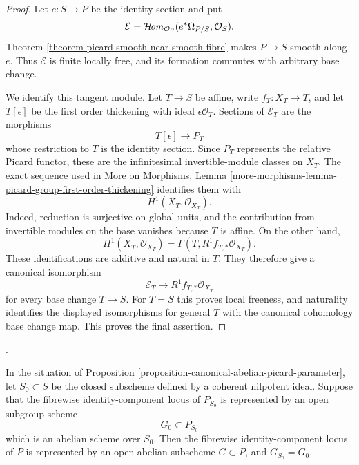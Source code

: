\begin{proof}
Let $e : S \to P$ be the identity section and put
$$
\mathcal{E}=
\mathop{\mathcal{H}\!\mathit{om}}\nolimits_{\mathcal{O}_S}(e^*\Omega_{P/S},\mathcal{O}_S).
$$
Theorem \ref{theorem-picard-smooth-near-smooth-fibre} makes $P \to S$ smooth
along $e$. Thus $\mathcal{E}$ is finite locally free, and its formation
commutes with arbitrary base change.

We identify this tangent module. Let $T \to S$ be affine, write
$f_T : X_T \to T$, and let $T[\epsilon]$ be the first order thickening with
ideal $\epsilon\mathcal{O}_T$. Sections of
$\mathcal{E}_T$ are the morphisms
$$
T[\epsilon] \longrightarrow P_T
$$
whose restriction to $T$ is the identity section. Since $P_T$ represents the
relative Picard functor, these are the infinitesimal invertible-module classes
on $X_T$. The exact sequence used in More on Morphisms, Lemma
\ref{more-morphisms-lemma-picard-group-first-order-thickening} identifies them
with
$$
H^1(X_T,\mathcal{O}_{X_T}).
$$
Indeed, reduction is surjective on global units, and the contribution from
invertible modules on the base vanishes because $T$ is affine. On the other
hand,
$$
H^1(X_T,\mathcal{O}_{X_T})
=\Gamma(T,R^1f_{T,*}\mathcal{O}_{X_T}).
$$
These identifications are additive and natural in $T$. They therefore give a
canonical isomorphism
$$
\mathcal{E}_T \longrightarrow R^1f_{T,*}\mathcal{O}_{X_T}
$$
for every base change $T \to S$. For $T=S$ this proves local freeness, and
naturality identifies the displayed isomorphisms for general $T$ with the
canonical cohomology base change map. This proves the final assertion.
\end{proof}

\begin{lemma}
\label{lemma-picard-identity-component-nilpotent-lift}
\begin{reference}
\cite[Expos\'e 236, Remark 3.7, p. 240]{FGA}.
\end{reference}
In the situation of Proposition
\ref{proposition-canonical-abelian-picard-parameter}, let
$S_0 \subset S$ be the closed subscheme defined by a coherent nilpotent ideal.
Suppose that the fibrewise identity-component locus of $P_{S_0}$ is
represented by an open subgroup scheme
$$
G_0 \subset P_{S_0}
$$
which is an abelian scheme over $S_0$. Then the fibrewise
identity-component locus of $P$ is represented by an open abelian subscheme
$G \subset P$, and $G_{S_0}=G_0$.
\end{lemma}

